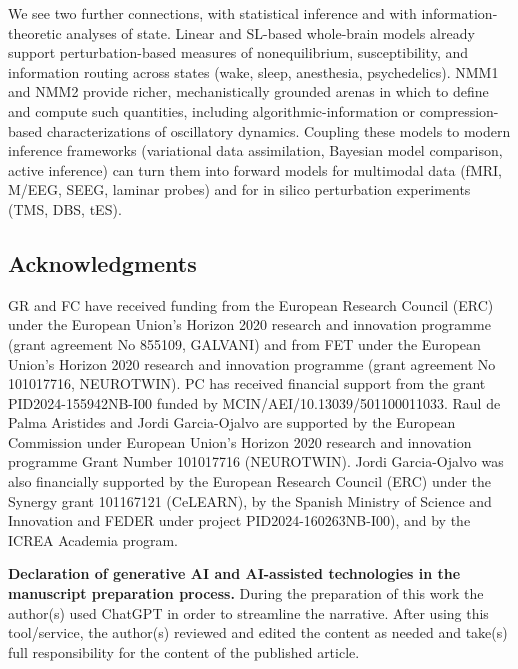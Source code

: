 \documentclass[12pt]{article}
\numberwithin{equation}{section}
\newcommand{\rev}[1]{\begingroup\color{blue}#1\endgroup}
\begin{document}
\rev{We see two further connections, with statistical inference and with information-theoretic analyses of state.} Linear and SL-based whole-brain models already support perturbation-based measures of nonequilibrium, susceptibility, and information routing across states (wake, sleep, anesthesia, psychedelics).\cite{decoTurbulentlikeDynamicsHuman2020,Escrichs2022Turbulence,cruzatEffectsClassicPsychedelic2022} NMM1 and NMM2 provide richer, mechanistically grounded arenas in which to define and compute such quantities, including algorithmic-information or compression-based characterizations of oscillatory dynamics. Coupling these models to modern inference frameworks (variational data assimilation, Bayesian model comparison, active inference) can turn them into forward models for multimodal data (fMRI, M/EEG, SEEG, laminar probes) and for in silico perturbation experiments (TMS, DBS, tES).\cite{breakspearDynamicModelsLargescale2017,Sadeghi2020,duchetHowDesignOptimal2024,ruffiniAlgorithmicAgentPerspective2024} 




 \subsection*{Acknowledgments}
GR and FC have received funding from the European Research Council (ERC) under the European Union’s Horizon 2020 research and innovation programme (grant agreement No 855109, GALVANI) and from FET under the European Union’s Horizon 2020 research and innovation programme (grant agreement No 101017716, NEUROTWIN). 
PC has received financial support from the grant PID2024-155942NB-I00 funded by MCIN/AEI/10.13039/501100011033.
Raul de Palma Aristides and Jordi Garcia-Ojalvo are supported by the European Commission under European Union’s Horizon 2020 research and innovation programme Grant Number 101017716 (NEUROTWIN). Jordi Garcia-Ojalvo was also financially supported by the European Research Council (ERC) under the Synergy grant 101167121 (CeLEARN), by the Spanish Ministry of Science and Innovation and FEDER under project PID2024-160263NB-I00), and by the ICREA Academia program.

\textbf{Declaration of generative AI and AI-assisted technologies in the manuscript preparation process.}
During the preparation of this work the author(s) used ChatGPT in order to streamline the narrative. After using this tool/service, the author(s) reviewed and edited the content as needed and take(s) full responsibility for the content of the published article.



\clearpage


\end{document}
